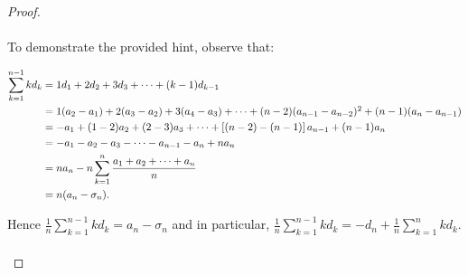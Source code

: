     \begin{proof}\ \\\\

        To demonstrate the provided hint, observe that:

        \renewcommand*{\thefootnote}{\fnsymbol{footnote}}
        \begin{align*}
            \sum\limits_{k=1}^{n-1}{kd_k} &= 1d_1 + 2d_2 + 3d_3 + \cdots + (k - 1)d_{k-1} \\
                                          &= 1(a_2 - a_1) 
                                           + 2(a_3 - a_2)
                                           + 3(a_4 - a_3)
                                           + \cdots
                                           + (n - 2)(a_{n-1} - a_{n-2})\footnotemark[2]
                                           + (n - 1)(a_n - a_{n-1}) \\
                                          &= -a_1 
                                             + (1 - 2)a_2 
                                             + (2 - 3)a_3
                                             +  \cdots
                                             +  \left[(n - 2) - (n - 1)\right]a_{n-1}
                                             + (n-1)a_{n} \\
                                          &= -a_1 
                                             - a_2
                                             - a_3 
                                             - \cdots
                                             - a_{n-1}
                                             - a_n + na_{n} \\
                                          &= na_n - n\sum\limits_{k=1}^{n}{\frac{a_1 + a_2 + \cdots + a_n}{n}} \\
                                          &= n(a_n - \sigma_n).
        \end{align*}

        Hence $\frac{1}{n}\sum\limits_{k=1}^{n-1}{kd_k} = a_n - \sigma_n$ and
        in particular, $\frac{1}{n}\sum\limits_{k=1}^{n-1}{kd_k} =  - d_n + \frac{1}{n}\sum\limits_{k=1}^{n}{kd_k}$.
        \\\\


\end{proof}

